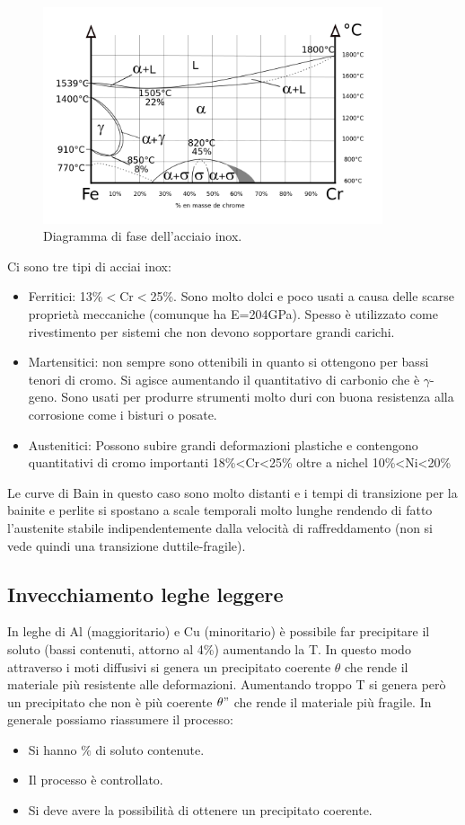 \begin{figure}
    \centering
    \includegraphics[width=10cm]{acciaio e transizioni di fase/Diagramme_phase_Fe.png}
    \caption{Diagramma di fase dell'acciaio inox.}
    \label{acciaio-inox.}
\end{figure}

Ci sono tre tipi di acciai inox:
\begin{itemize}
    \item Ferritici: 13\%$<$Cr$<$25\%. Sono molto dolci e poco usati a causa delle scarse proprietà meccaniche (comunque ha E=204GPa). Spesso è utilizzato come rivestimento per sistemi che non devono sopportare grandi carichi.
    \item Martensitici: non sempre sono ottenibili in quanto si ottengono per bassi tenori di cromo. Si agisce aumentando il quantitativo di carbonio che è $\gamma$-geno. Sono usati per produrre strumenti molto duri con buona resistenza alla corrosione come i bisturi o posate.
    \item Austenitici: Possono subire grandi deformazioni plastiche e contengono quantitativi di cromo importanti 18\%<Cr<25\% oltre a nichel 10\%<Ni<20\%
    \end{itemize}
Le curve di Bain in questo caso sono molto distanti e i tempi di transizione per la bainite e perlite si spostano a scale temporali molto lunghe rendendo di fatto l'austenite stabile indipendentemente dalla velocità di raffreddamento (non si vede quindi una transizione duttile-fragile). 

\subsection{Invecchiamento leghe leggere}

In leghe di Al (maggioritario) e Cu (minoritario) è possibile far precipitare il soluto (bassi contenuti, attorno al 4\%) aumentando la T.
In questo modo attraverso i moti diffusivi si genera un precipitato coerente $\theta$ che rende il materiale più resistente alle deformazioni. Aumentando troppo T si genera però un precipitato che non è più coerente $\theta"$ che rende il materiale più fragile.
In generale possiamo riassumere il processo:
\begin{itemize}
    \item Si hanno $\%$ di soluto contenute.
    \item Il processo è controllato.
    \item Si deve avere la possibilità di ottenere un precipitato coerente.
\end{itemize}

